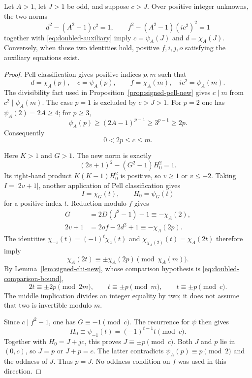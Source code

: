 \begin{lemma}\label{lem:doubled-main-index}
Let $A>1$, let $J>1$ be odd, and suppose $c>J$. Over positive integer
unknowns, the two norms
\[
 d^2-(A^2-1)c^2=1,
 \qquad f^2-(A^2-1)(ic^2)^2=1
\]
together with \eqref{eq:doubled-auxiliary} imply
$c=\psi_A(J)$ and $d=\chi_A(J)$. Conversely, when those two identities
hold, positive $f,i,j,o$ satisfying the auxiliary equations exist.
\end{lemma}
\begin{proof}
Pell classification gives positive indices $p,m$ such that
\[
 d=\chi_A(p),\quad c=\psi_A(p),\qquad
 f=\chi_A(m),\quad ic^2=\psi_A(m).
\]
The divisibility fact used in Proposition~\ref{prop:signed-pell-new}
gives $c\mid m$ from $c^2\mid\psi_A(m)$. The case $p=1$ is excluded
by $c>J>1$. For $p=2$ one has $\psi_A(2)=2A\ge4$; for $p\ge3$,
\[
 \psi_A(p)\ge(2A-1)^{p-1}\ge3^{p-1}\ge2p.
\]
Consequently
\begin{equation}\label{eq:doubled-comparison-bound}
 0<2p\le c\le m.
\end{equation}

Here $K>1$ and $G>1$. The new norm is exactly
\[
 (2v+1)^2-(G^2-1)H_0^2=1.
\]
Its right-hand product $K(K-1)H_0^2$ is positive, so $v\ge1$ or
$v\le-2$. Taking $I=|2v+1|$, another application of Pell
classification gives
\[
 I=\chi_G(t),\qquad H_0=\psi_G(t)
\]
for a positive index $t$. Reduction modulo $f$ gives
\[
 \begin{aligned}
 G&=2D(f^2-1)-1\equiv-\chi_A(2),\\
 2v+1&=2of-2d^2+1\equiv-\chi_A(2p).
 \end{aligned}
\]
The identities
$\chi_{-z}(t)=(-1)^t\chi_z(t)$ and
$\chi_{\chi_A(2)}(t)=\chi_A(2t)$ therefore imply
\[
 \chi_A(2t)\equiv\pm\chi_A(2p)\pmod{\chi_A(m)}.
\]
By Lemma~\ref{lem:signed-chi-new}, whose comparison hypothesis is
\eqref{eq:doubled-comparison-bound},
\[
 2t\equiv\pm2p\pmod{2m},\qquad
 t\equiv\pm p\pmod m,\qquad t\equiv\pm p\pmod c.
\]
The middle implication divides an integer equality by two; it does
not assume that two is invertible modulo $m$.

Since $c\mid f^2-1$, one has $G\equiv-1\pmod c$. The recurrence for
$\psi$ then gives
\[
 H_0\equiv\psi_{-1}(t)=(-1)^{t-1}t\pmod c.
\]
Together with $H_0=J+jc$, this proves $J\equiv\pm p\pmod c$.
Both $J$ and $p$ lie in $(0,c)$, so $J=p$ or $J+p=c$. The latter
contradicts $\psi_A(p)\equiv p\pmod2$ and the oddness of $J$.
Thus $p=J$. No oddness condition on $f$ was used in this direction.


\end{proof}
